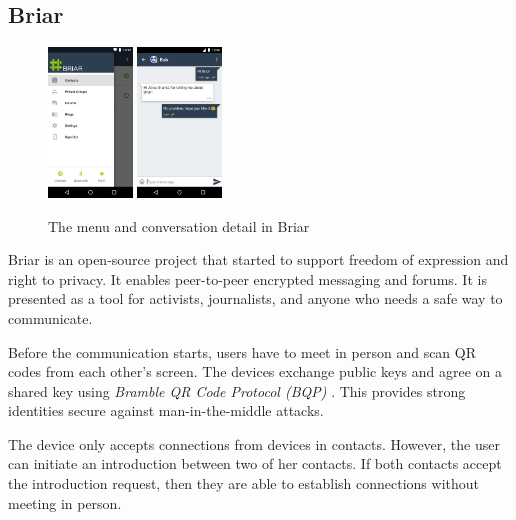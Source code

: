 \documentclass[conference,compsoc]{IEEEtran}
\begin{document}
\subsection{Briar}

\begin{figure}[h]
  \centering
  \includegraphics[width=0.2\textwidth]{briar1}
  \includegraphics[width=0.2\textwidth]{briar2}
  \caption{The menu and conversation detail in Briar \cite{briar_gplay}}
\end{figure}

Briar \cite{briar_gplay} is an open-source project that started to support freedom of expression and right to privacy. It enables peer-to-peer encrypted messaging and forums. It is presented as a tool for activists, journalists, and anyone who needs a safe way to communicate.

Before the communication starts, users have to meet in person and scan QR codes from each other's screen. The devices exchange public keys and agree on a shared key using \textit{Bramble QR Code Protocol (BQP)} \cite{briar_bqp}.
This provides strong identities secure against man-in-the-middle attacks.

The device only accepts connections from devices in contacts. However, the user can initiate an introduction between two of her contacts. If both contacts accept the introduction request, then they are able to establish connections without meeting in person.
\end{document}
